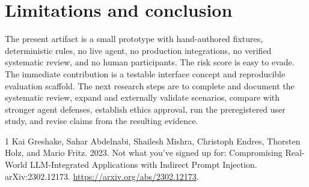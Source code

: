 \documentclass[11pt]{article}
\begin{document}
\section{Limitations and conclusion}
The present artifact is a small prototype with hand-authored fixtures, deterministic rules, no live agent, no production integrations, no verified systematic review, and no human participants. The risk score is easy to evade. The immediate contribution is a testable interface concept and reproducible evaluation scaffold. The next research steps are to complete and document the systematic review, expand and externally validate scenarios, compare with stronger agent defenses, establish ethics approval, run the preregistered user study, and revise claims from the resulting evidence.

\begin{thebibliography}{1}
Kai Greshake, Sahar Abdelnabi, Shailesh Mishra, Christoph Endres, Thorsten Holz, and Mario Fritz. 2023.
\newblock Not what you've signed up for: Compromising Real-World LLM-Integrated Applications with Indirect Prompt Injection.
\newblock arXiv:2302.12173. \url{https://arxiv.org/abs/2302.12173}.
\end{thebibliography}
\end{document}
